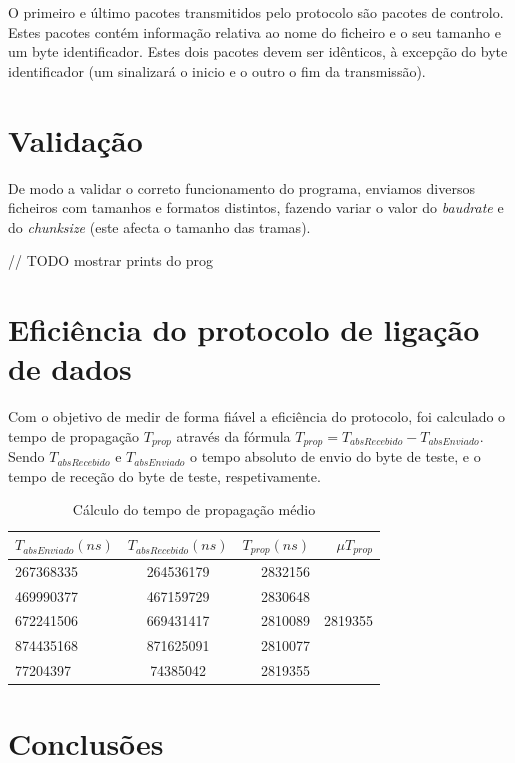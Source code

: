 \documentclass[11pt]{report}
\begin{document}
O primeiro e último pacotes transmitidos pelo protocolo são pacotes de controlo.
Estes pacotes contém informação relativa ao nome do ficheiro e o seu tamanho e
um byte identificador. Estes dois pacotes devem ser idênticos, à excepção do byte
identificador (um sinalizará o inicio e o outro o fim da transmissão).

{\let\clearpage\relax \chapter{Validação}}

De modo a validar o correto funcionamento do programa, enviamos diversos ficheiros
com tamanhos e formatos distintos, fazendo variar o valor do \textit{baudrate}
e do \textit{chunksize} (este afecta o tamanho das tramas).

// TODO mostrar prints do prog

\chapter{Eficiência do protocolo de ligação de dados}

Com o objetivo de medir de forma fiável a eficiência do protocolo, foi calculado
o tempo de propagação $T_{prop}$ através da fórmula
$T_{prop} = T_{absRecebido} - T_{absEnviado}$. Sendo $T_{absRecebido}$ e $T_{absEnviado}$ o tempo
absoluto de envio do byte de teste, e o tempo de receção do byte de teste, respetivamente.

\begin{table}[h!]
  \begin{center}
    \caption{Cálculo do tempo de propagação médio}
    \label{tab:table1}
    \begin{tabular}{l|c|r|r} %
        \textbf{$T_{absEnviado}(ns)$} &\textbf{$T_{absRecebido}(ns)$} & \textbf{$T_{prop}(ns)$} & \textbf{$\mu T_{prop}$}\\
      \hline
      267368335 & 264536179 & 2832156\\
      469990377 & 467159729 & 2830648\\
        672241506 & 669431417 & 2810089 & 2819355\\
      874435168 & 871625091 & 2810077\\
      77204397 & 74385042 & 2819355\\
    \end{tabular}
  \end{center}
\end{table}


\chapter{Conclusões}
\end{document}
